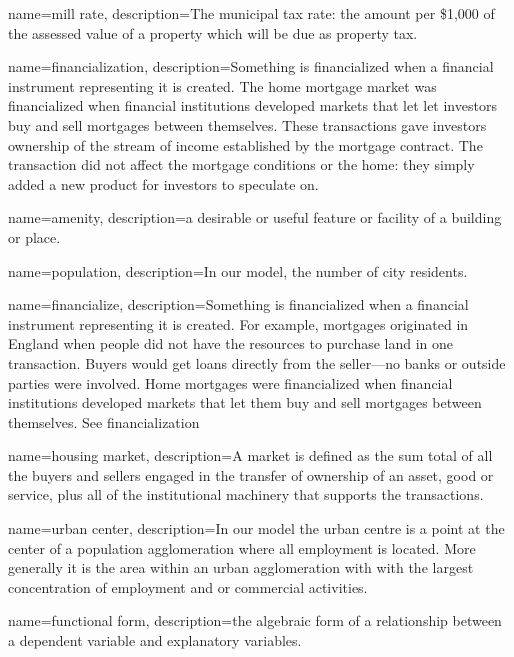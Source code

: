 {
name=mill rate,
description={The municipal tax rate: the amount per \$1,000 of the assessed value of a property which will be due as property tax.}
}

{
name=financialization,
description={Something is financialized when a financial instrument representing it is created. The  home mortgage market was financialized when financial institutions developed markets that let let investors buy and sell mortgages between themselves. These transactions gave investors ownership of the stream of income established by the mortgage contract. The transaction did not affect the mortgage conditions or the home: they simply added a new product for investors to speculate on. }
}

{
name=amenity,
description={a desirable or useful feature or facility of a building or place.}
}

{
name=population,
description={In our model, the number of city residents. }
}

{
name=financialize,
description={Something is financialized when a financial instrument representing it is created. For example, mortgages originated in England when people did not have the resources to purchase land in one transaction. Buyers would get loans directly from the seller---no banks or outside parties were involved. Home mortgages were financialized when financial institutions developed markets that let them buy and sell mortgages between themselves.  See \gls{financialization}}
}

{
name=housing market,
description={A market is defined as the sum total of all the buyers and sellers engaged in the transfer of ownership of an asset, good or service, plus all of the institutional machinery that supports the transactions. }
}

{
name=urban center,
description={In our model the urban centre is a point at the center of a population agglomeration where all employment is located. More generally it is the area within an urban agglomeration with with the largest  concentration of employment and or commercial activities.} 
}

{
name=functional form,
description={the algebraic form of a relationship between a dependent variable and explanatory variables.}
}

